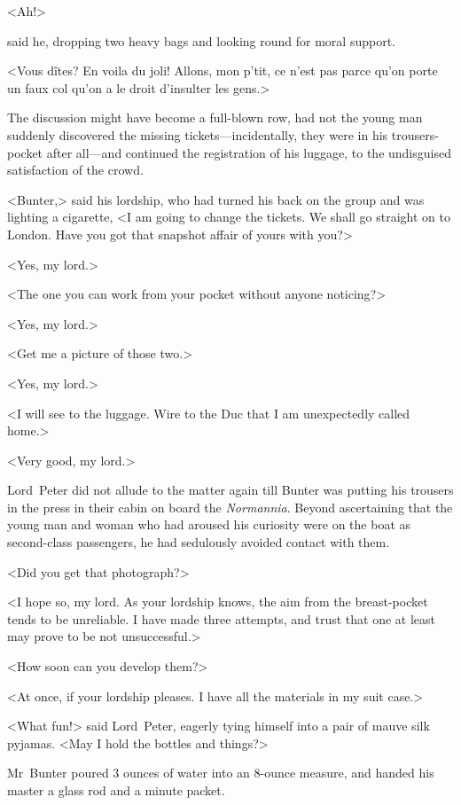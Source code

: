 \begin{french}<Ah!>\end{french} said he, dropping two heavy bags and looking round for moral support. \begin{french}<Vous dîtes? En voila du joli! Allons, mon p'tit, ce n'est pas parce qu'on porte un faux col qu'on a le droit d'insulter les gens.>\end{french}

The discussion might have become a full-blown row, had not the young man suddenly discovered the missing tickets—incidentally, they were in his trousers-pocket after all—and continued the registration of his luggage, to the undisguised satisfaction of the crowd.

<Bunter,> said his lordship, who had turned his back on the group and was lighting a cigarette, <I am going to change the tickets. We shall go straight on to London. Have you got that snapshot affair of yours with you?>

<Yes, my lord.>

<The one you can work from your pocket without anyone noticing?>

<Yes, my lord.>

<Get me a picture of those two.>

<Yes, my lord.>

<I will see to the luggage. Wire to the Duc that I am unexpectedly called home.>

<Very good, my lord.>

Lord~Peter did not allude to the matter again till Bunter was putting his trousers in the press in their cabin on board the \textit{Normannia}. Beyond ascertaining that the young man and woman who had aroused his curiosity were on the boat as second-class passengers, he had sedulously avoided contact with them.

<Did you get that photograph?>

<I hope so, my lord. As your lordship knows, the aim from the breast-pocket tends to be unreliable. I have made three attempts, and trust that one at least may prove to be not unsuccessful.>

<How soon can you develop them?>

<At once, if your lordship pleases. I have all the materials in my suit case.>

<What fun!> said Lord~Peter, eagerly tying himself into a pair of mauve silk pyjamas. <May I hold the bottles and things?>

Mr~Bunter poured 3 ounces of water into an 8-ounce measure, and handed his master a glass rod and a minute packet.

